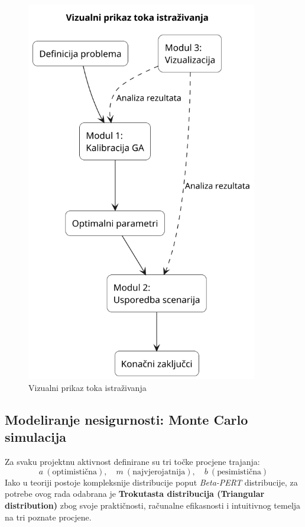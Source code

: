 \begin{figure}[H]
    \centering
    \includegraphics[width=0.9\textwidth]{slike/tijek_istrazivanja.png}
    \caption{Vizualni prikaz toka istraživanja}
    \label{tok istraživanja}
\end{figure}

\subsection{Modeliranje nesigurnosti: Monte Carlo simulacija}

Za svaku projektnu aktivnost definirane su tri točke procjene trajanja:
\[
a \ (\text{optimistična}), \quad
m \ (\text{najvjerojatnija}), \quad
b \ (\text{pesimistična})
\]
Iako u teoriji postoje kompleksnije distribucije poput \textit{Beta-PERT} distribucije, 
za potrebe ovog rada odabrana je \textbf{Trokutasta distribucija (Triangular distribution)} 
zbog svoje praktičnosti, računalne efikasnosti i intuitivnog temelja na tri poznate procjene.

